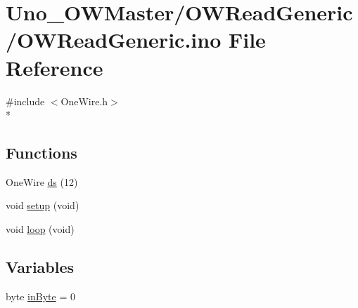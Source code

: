 \hypertarget{OWReadGeneric_8ino}{\section{Uno\-\_\-\-O\-W\-Master/\-O\-W\-Read\-Generic/\-O\-W\-Read\-Generic.ino File Reference}
\label{OWReadGeneric_8ino}
}
{\ttfamily \#include $<$One\-Wire.\-h$>$}\\*
\subsection*{Functions}
\begin{DoxyCompactItemize}
\item 
One\-Wire \hyperlink{OWReadGeneric_8ino_a964b61090de1a28914b540d275b3cda8}{ds} (12)
\item 
void \hyperlink{OWReadGeneric_8ino_a7dfd9b79bc5a37d7df40207afbc5431f}{setup} (void)
\item 
void \hyperlink{OWReadGeneric_8ino_a0b33edabd7f1c4e4a0bf32c67269be2f}{loop} (void)
\end{DoxyCompactItemize}
\subsection*{Variables}
\begin{DoxyCompactItemize}
\item 
byte \hyperlink{OWReadGeneric_8ino_a62cd173143ff9c15a38fd17ab56970c9}{in\-Byte} = 0
\end{DoxyCompactItemize}


